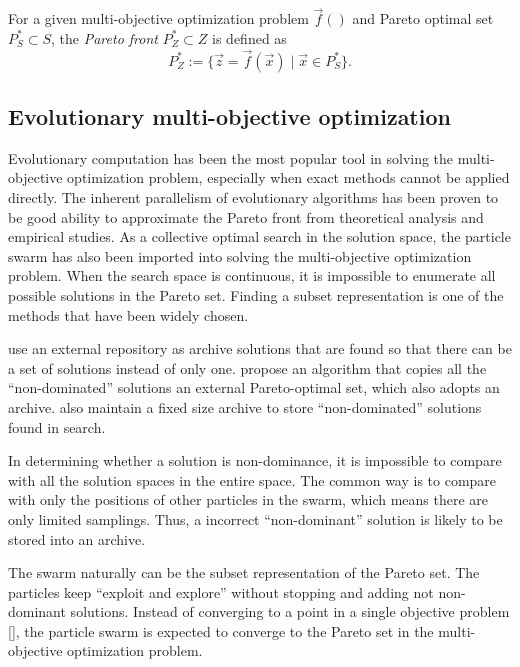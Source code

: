 \documentclass[12pt]{article}
\begin{document}
\begin{mydef}
\label{def:pareto_front}
For a given multi-objective optimization problem $ \vec{f}() $ and Pareto optimal set $ P^{*}_{S} \subset S $, the \emph{Pareto front} $ P^{*}_{Z} \subset Z $ is defined as
\begin{equation}
\label{eq:pa_front}
P^{*}_{Z} := \{ \vec{z} = \vec{f}(\vec{x}) \mid \vec{x} \in P^{*}_{S} \}.
\end{equation}
\end{mydef}

\subsection{Evolutionary multi-objective optimization}

Evolutionary computation has been the most popular tool in solving the multi-objective optimization problem, especially when exact methods cannot be applied directly.
The inherent parallelism of evolutionary algorithms has been proven to be good ability to approximate the Pareto front from theoretical analysis and empirical studies.
As a collective optimal search in the solution space, the particle swarm has also been imported into solving the multi-objective optimization problem.
When the search space is continuous, it is impossible to enumerate all possible solutions in the Pareto set.
Finding a subset representation is one of the methods that have been widely chosen.


\cite{coello2002mopso} use an external repository as archive solutions that are found so that there can be a set of solutions instead of only one.
\cite{abido2007two} propose an algorithm that copies all the ``non-dominated'' solutions an external Pareto-optimal set, which also adopts an archive.
\cite{yen2009dynamic} also maintain a fixed size archive to store ``non-dominated'' solutions found in search.

In determining whether a solution is non-dominance, it is impossible to compare with all the solution spaces in the entire space.
The common way is to compare with only the positions of other particles in the swarm, which means there are only limited samplings.
Thus, a incorrect ``non-dominant'' solution is likely to be stored into an archive.

The swarm naturally can be the subset representation of the Pareto set.
The particles keep ``exploit and explore'' without stopping and adding not non-dominant solutions.
Instead of converging to a point in a single objective problem [\cite{clerc2002particle}], the particle swarm is expected to converge to the Pareto set in the multi-objective optimization problem.
\end{document}
